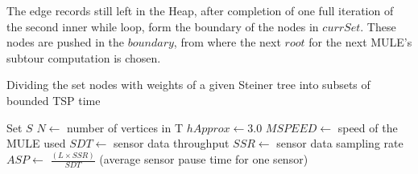 The edge records still left in the Heap, after completion of one full iteration of the second inner while loop, form the boundary of the nodes in $currSet$. These nodes are pushed in the $boundary$, from where the next $root$ for the next MULE's subtour computation is chosen.%

\begin{algorithm}
\caption{Dividing the set nodes with weights of a given Steiner tree into subsets of bounded TSP time}\label{euclid}
\begin{algorithmic}
\State Set  $S$
\State $N \gets$ number of vertices in T
\State $hApprox \gets 3.0$
\State $MSPEED \gets$ speed of the MULE used
\State $SDT \gets$ sensor data throughput
\State $SSR \gets$ sensor data sampling rate
\State $ASP \gets$ $\frac{(L\times SSR)}{SDT}$ (average sensor pause time for one sensor)

\end{algorithmic}
\end{algorithm}

